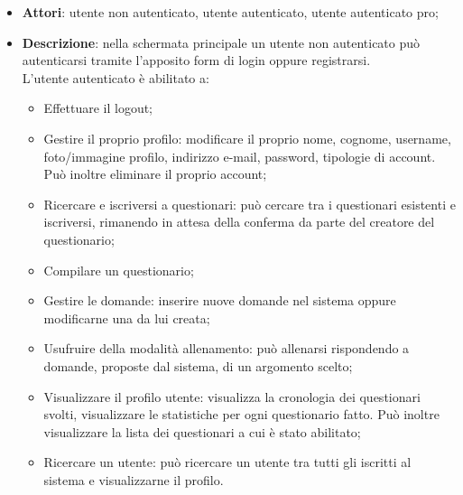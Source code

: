\begin{itemize}
\item\textbf{Attori}: utente non autenticato, utente autenticato, utente autenticato pro;
\item\textbf{Descrizione}: nella schermata principale un utente non autenticato può autenticarsi tramite l'apposito form di login oppure registrarsi.\\
L'utente autenticato è abilitato a:
\begin{itemize}
\item Effettuare il logout;
\item Gestire il proprio profilo: modificare il proprio nome, cognome, username, foto/immagine profilo, indirizzo e-mail, password, tipologie di account. Può inoltre eliminare il proprio account;
\item Ricercare e iscriversi a questionari: può cercare tra i questionari esistenti e iscriversi, rimanendo in attesa della conferma da parte del creatore del questionario;
\item Compilare un questionario;
\item Gestire le domande: inserire nuove domande nel sistema oppure modificarne una da lui creata;
\item Usufruire della modalità allenamento: può allenarsi rispondendo a domande, proposte dal sistema, di un argomento scelto;
\item Visualizzare il profilo utente: visualizza la cronologia dei questionari svolti, visualizzare le statistiche per ogni questionario fatto. Può inoltre visualizzare la lista dei questionari a cui è stato abilitato;
\item Ricercare un utente: può ricercare un utente tra tutti gli iscritti al sistema e visualizzarne il profilo.
\end{itemize}


\end{itemize}

